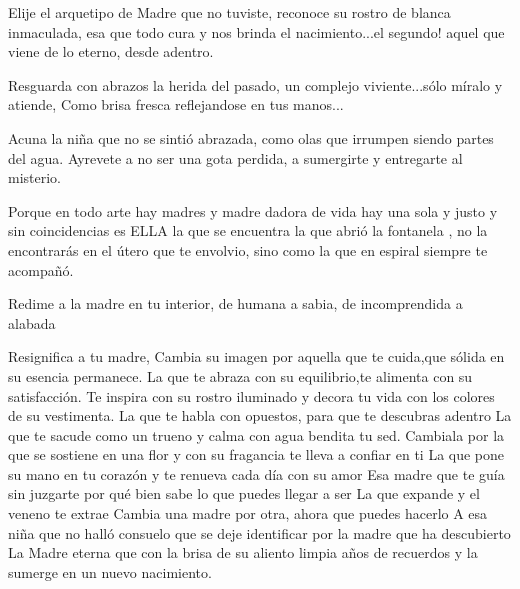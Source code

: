 \documentclass[12pt, a4paper, twoside]{book} %
\begin{document}
Elije el arquetipo de Madre que no tuviste, reconoce su rostro de blanca inmaculada, esa que todo cura y nos brinda el nacimiento...el segundo! aquel que viene de lo eterno, desde adentro.

Resguarda con abrazos la herida del pasado, un complejo viviente...sólo míralo y atiende,
Como brisa fresca reflejandose en tus manos...

Acuna la niña que no se sintió abrazada, como olas que irrumpen siendo partes del agua.
Ayrevete  a no ser  una gota perdida, a sumergirte y entregarte al misterio.

Porque en todo arte hay madres y madre dadora de vida hay una sola y justo y sin coincidencias es ELLA la que se encuentra la que abrió la fontanela , no la encontrarás en el  útero que te envolvio, sino como  la que en espiral siempre te acompañó.

Redime a la madre en tu interior, de humana a sabia, de incomprendida a alabada


Resignifica a tu madre,
Cambia su imagen por aquella que te cuida,que sólida en su esencia permanece.
La que te abraza con su equilibrio,te alimenta con su satisfacción.
Te inspira con su rostro iluminado y decora tu vida con los colores de su vestimenta.
La que te habla con opuestos, para que te descubras adentro
La que te sacude como un trueno y calma con agua bendita tu sed.
Cambiala por la que se sostiene en una flor y con su fragancia te lleva a confiar en ti
La que pone su mano en tu corazón y te renueva cada día con su amor
Esa madre que te guía sin juzgarte por qué bien sabe lo que puedes llegar a ser
La que expande y el veneno te extrae
Cambia una madre por otra, ahora que puedes hacerlo
A esa niña que no halló consuelo que se deje identificar por la madre que ha descubierto
La Madre eterna que con la brisa de su aliento limpia años de recuerdos y la sumerge en un nuevo nacimiento.
\end{document}
